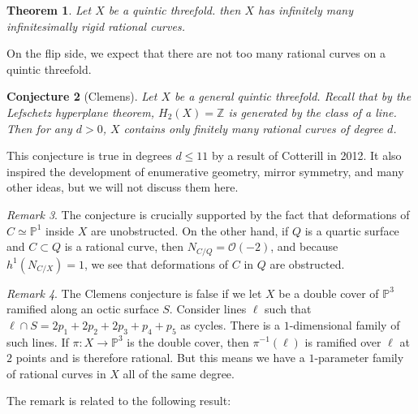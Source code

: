\documentclass[leqno, openany]{memoir}
\newtheorem{thm}{Theorem}[section]
\newtheorem{conj}[thm]{Conjecture}
\theoremstyle{definition}
\theoremstyle{remark}
\newtheorem{rmk}[thm]{Remark}
\theoremstyle{plain}
\theoremstyle{definition}
\theoremstyle{remark}
\newcommand{\Z}{\mathbb{Z}}
\renewcommand{\P}{\mathbb{P}}
\newcommand{\mc}[1]{\mathcal{#1}}
\begin{document}
\begin{thm}
    Let $X$ be a quintic threefold. then $X$ has infinitely many infinitesimally rigid rational curves.
\end{thm}

On the flip side, we expect that there are not too many rational curves on a quintic threefold.

\begin{conj}[Clemens]
    Let $X$ be a general quintic threefold. Recall that by the Lefschetz hyperplane theorem, $H_2(X) = \Z$ is generated by the class of a line. Then for any $d > 0$, $X$ contains only finitely many rational curves of degree $d$.
\end{conj}

This conjecture is true in degrees $d \leq 11$ by a result of Cotterill in 2012. It also inspired the development of enumerative geometry, mirror symmetry, and many other ideas, but we will not discuss them here.

\begin{rmk}
    The conjecture is crucially supported by the fact that deformations of $C \simeq \P^1$ inside $X$ are unobstructed. On the other hand, if $Q$ is a quartic surface and $C \subset Q$ is a rational curve, then $N_{C/Q} = \mc{O}(-2)$, and because $h^1(N_{C/X}) = 1$, we see that deformations of $C$ in $Q$ are obstructed.
\end{rmk}

\begin{rmk}
    The Clemens conjecture is false if we let $X$ be a double cover of $\P^3$ ramified along an octic surface $S$. Consider lines $\ell$ such that $\ell \cap S = 2p_1 + 2 p_2 + 2 p_3 + p_4 + p_5$ as cycles. There is a $1$-dimensional family of such lines. If $\pi \colon X \to \P^3$ is the double cover, then $\pi^{-1}(\ell)$ is ramified over $\ell$ at $2$ points and is therefore rational. But this means we have a $1$-parameter family of rational curves in $X$ all of the same degree.
\end{rmk}

The remark is related to the following result:
\end{document}
